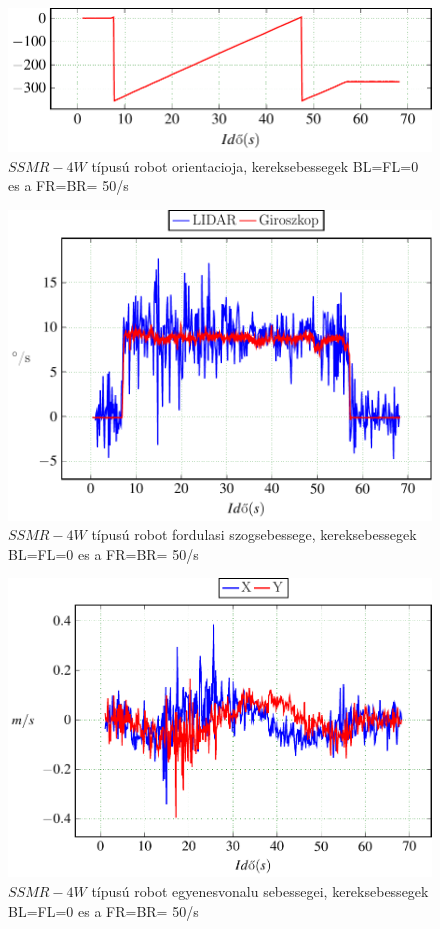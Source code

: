 \begin{figure}[H]
  \includegraphics{tikz/Left0Right50c.pdf}
  \caption{$SSMR-4W$ típusú robot orientacioja, kereksebessegek BL=FL=0 es a FR=BR= 50\degree/s}
  \label{fig:Left0Right50c}
\end{figure}


\begin{figure}[H]
  \label{fig:Left0Right50d}
  \includegraphics{tikz/Left0Right50d.pdf}
  \caption{$SSMR-4W$ típusú robot fordulasi szogsebessege, kereksebessegek BL=FL=0 es a FR=BR= 50\degree/s}
  \label{fig:Left0Right50d}
\end{figure}


\begin{figure}[H]
  \includegraphics{tikz/Left0Right50e.pdf}
  \caption{$SSMR-4W$ típusú robot egyenesvonalu sebessegei, kereksebessegek BL=FL=0 es a FR=BR= 50\degree/s}
  \label{fig:Left0Right50e}  
\end{figure}




